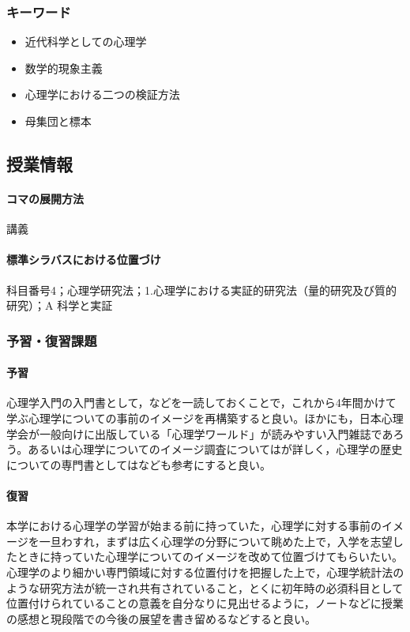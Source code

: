 \subsubsection{キーワード}
\begin{itemize}
\item 近代科学としての心理学
\item 数学的現象主義
\item 心理学における二つの検証方法
\item 母集団と標本
\end{itemize}
\subsection{授業情報}
\paragraph{コマの展開方法}
講義
\paragraph{標準シラバスにおける位置づけ}
科目番号4；心理学研究法；1.心理学における実証的研究法（量的研究及び質的研究）；A 科学と実証
\subsubsection{予習・復習課題}
\paragraph{予習}
心理学入門の入門書として，\citet{中西201507,道又200903}などを一読しておくことで，これから4年間かけて学ぶ心理学についての事前のイメージを再構築すると良い。ほかにも，日本心理学会が一般向けに出版している「心理学ワールド」が読みやすい入門雑誌であろう。あるいは心理学についてのイメージ調査については\citet{菊池2018}が詳しく，心理学の歴史についての専門書としては\citet{大芦201610}なども参考にすると良い。
\paragraph{復習}
本学における心理学の学習が始まる前に持っていた，心理学に対する事前のイメージを一旦わすれ，まずは広く心理学の分野について眺めた上で，入学を志望したときに持っていた心理学についてのイメージを改めて位置づけてもらいたい。心理学のより細かい専門領域に対する位置付けを把握した上で，心理学統計法のような研究方法が統一され共有されていること，とくに初年時の必須科目として位置付けられていることの意義を自分なりに見出せるように，ノートなどに授業の感想と現段階での今後の展望を書き留めるなどすると良い。
